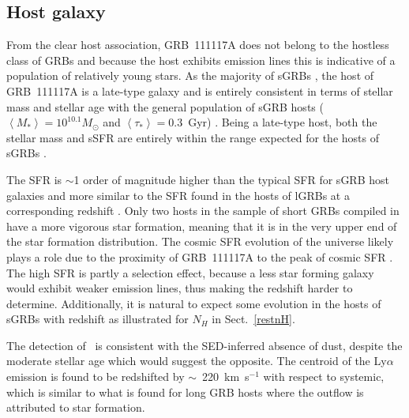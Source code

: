 \documentclass{aa}    %
\begin{document}

\subsection{Host galaxy}

From the clear host association, GRB~111117A does not belong to the hostless
class of GRBs \citep{Berger2010a} and because the host exhibits emission lines
this is indicative of a population of relatively young stars. As the majority of
sGRBs \citep{Fong2013b}, the host of GRB~111117A is a late-type galaxy and is
entirely consistent in terms of stellar mass and stellar age with the general
population of sGRB hosts ($\left\langle M _* \right\rangle = 10^{10.1}
M_{\odot}$ and $\left\langle \tau _* \right\rangle = 0.3 $~Gyr)
\citep{Leibler2010}. Being a late-type host, both the stellar mass and sSFR are
entirely within the range expected for the hosts of sGRBs \citep{Behroozi2014}. 

The SFR is $\sim$1 order of magnitude higher than the typical SFR for sGRB host
galaxies \citep{Berger2014} and more similar to the SFR found in the hosts of
lGRBs at a corresponding redshift \citep{Kruhler2015}. Only two hosts in the
sample of short GRBs compiled in \citet{Berger2014} have a more vigorous star
formation, meaning that it is in the very upper end of the star formation
distribution. The cosmic SFR evolution of the universe likely plays a role due
to the proximity of GRB~111117A to the peak of cosmic SFR \citep{Madau2014}.
The high SFR is partly a selection effect, because a less star forming galaxy
would exhibit weaker emission lines, thus making the redshift harder to
determine. Additionally, it is natural to expect some evolution in the hosts of
sGRBs with redshift as illustrated for $N_H$ in Sect.~\ref{restnH}.

The detection of \lya~is consistent with the SED-inferred absence of dust,
despite the moderate stellar age which would suggest the opposite. The centroid
of the Ly$\alpha$ emission is found to be redshifted by $\sim$~220~km~s$^{-1}$
with respect to systemic, which is similar to what is found for long GRB hosts
\citep{Milvang-Jensen2012a} where the outflow is attributed to star formation.
\end{document}

